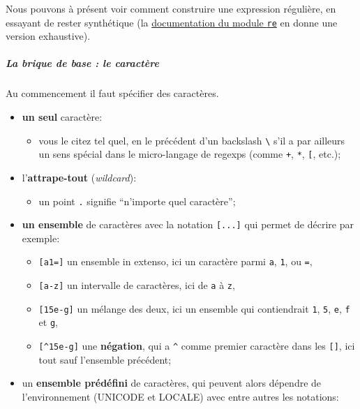     Nous pouvons à présent voir comment construire une expression régulière,
en essayant de rester synthétique (la
\href{https://docs.python.org/3/library/re.html}{documentation du module
\texttt{re}} en donne une version exhaustive).

    \hypertarget{la-brique-de-base-le-caractuxe8re}{%
\subparagraph{La brique de base : le
caractère}\label{la-brique-de-base-le-caractuxe8re}}

    Au commencement il faut spécifier des caractères.

\begin{itemize}
\tightlist
\item
  \textbf{un seul} caractère:

  \begin{itemize}
  \tightlist
  \item
    vous le citez tel quel, en le précédent d'un backslash
    \texttt{\textbackslash{}} s'il a par ailleurs un sens spécial dans
    le micro-langage de regexps (comme \texttt{+}, \texttt{*},
    \texttt{{[}}, etc.);
  \end{itemize}
\item
  l'\textbf{attrape-tout} (\emph{wildcard}):

  \begin{itemize}
  \tightlist
  \item
    un point \texttt{.} signifie ``n'importe quel caractère'';
  \end{itemize}
\item
  \textbf{un ensemble} de caractères avec la notation \texttt{{[}...{]}}
  qui permet de décrire par exemple:

  \begin{itemize}
  \tightlist
  \item
    \texttt{{[}a1={]}} un ensemble in extenso, ici un caractère parmi
    \texttt{a}, \texttt{1}, ou \texttt{=},
  \item
    \texttt{{[}a-z{]}} un intervalle de caractères, ici de \texttt{a} à
    \texttt{z},
  \item
    \texttt{{[}15e-g{]}} un mélange des deux, ici un ensemble qui
    contiendrait \texttt{1}, \texttt{5}, \texttt{e}, \texttt{f} et
    \texttt{g},
  \item
    \texttt{{[}\^{}15e-g{]}} une \textbf{négation}, qui a \texttt{\^{}}
    comme premier caractère dans les \texttt{{[}{]}}, ici tout sauf
    l'ensemble précédent;
  \end{itemize}
\item
  un \textbf{ensemble prédéfini} de caractères, qui peuvent alors
  dépendre de l'environnement (UNICODE et LOCALE) avec entre autres les
  notations:


\end{itemize}
